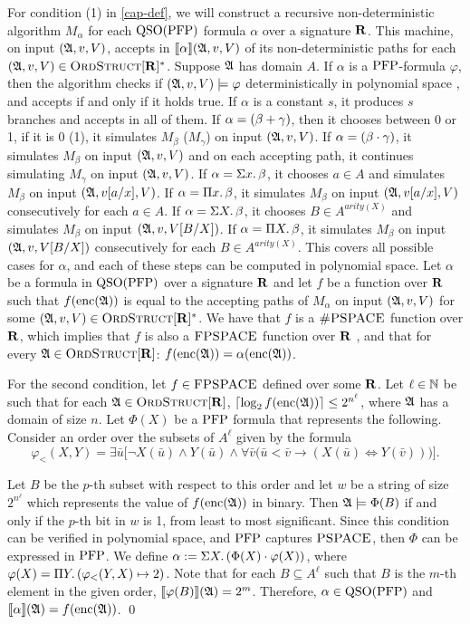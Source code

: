 For condition (1) in \ref{cap-def}, we will construct a recursive non-deterministic algorithm $M_{\alpha}$ for each ${\rm QSO}({\rm PFP})$ formula $\alpha$ over a signature $\mathbf{R}$. This machine, on input $(\mathfrak{A},v,V)$, accepts in ${\llbracket{}{\alpha}\rrbracket}(\mathfrak{A},v,V)$ of its non-deterministic paths for each $(\mathfrak{A},v,V) \in \text{\sc OrdStruct}[\mathbf{R}]^*$. Suppose $\mathfrak{A}$ has domain $A$. If $\alpha$ is a ${\rm PFP}$-formula $\varphi$, then the algorithm checks if $(\mathfrak{A},v,V)\models\varphi$ deterministically in polynomial space \cite{DBLP:conf/lics/AbiteboulV89}, and accepts if and only if it holds true. If $\alpha$ is a constant $s$, it produces $s$ branches and accepts in all of them. If $\alpha = (\beta + \gamma)$, then it chooses between 0 or 1, if it is 0 (1), it simulates $M_{\beta}$ ($M_{\gamma}$) on input $(\mathfrak{A},v,V)$. If $\alpha = (\beta \cdot \gamma)$, it simulates $M_{\beta}$ on input $(\mathfrak{A},v,V)$ and on each accepting path, it continues simulating $M_{\gamma}$ on input $(\mathfrak{A},v,V)$. If $\alpha = \Sigma{x}.\,\beta$, it chooses $a\in A$ and simulates $M_{\beta}$ on input $(\mathfrak{A},v[a/x],V)$. If $\alpha = \Pi{x}.\,\beta$, it simulates $M_{\beta}$ on input $(\mathfrak{A},v[a/x],V)$ consecutively for each $a\in A$. If $\alpha = \Sigma{X}.\,\beta$, it chooses $B\in A^{arity(X)}$ and simulates $M_{\beta}$ on input $(\mathfrak{A},v,V[B/X])$. If $\alpha = \Pi{X}.\,\beta$, it simulates $M_{\beta}$ on input $(\mathfrak{A},v,V[B/X])$ consecutively for each $B\in A^{arity(X)}$. This covers all possible cases for $\alpha$, and each of these steps can be computed in polynomial space. Let $\alpha$ be a formula in ${\rm QSO}({\rm PFP})$ over a signature $\mathbf{R}$ and let $f$ be a function over $\mathbf{R}$ such that $f({\rm enc}(\mathfrak{A}))$ is equal to the accepting paths of $M_{\alpha}$ on input $(\mathfrak{A},v,V)$ for some $(\mathfrak{A},v,V) \in \text{\sc OrdStruct}[\mathbf{R}]^*$. We have that $f$ is a $\text{\sc \#PSPACE}$ function over $\mathbf{R}$, which implies that $f$ is also a $\text{\sc FPSPACE}$ function over $\mathbf{R}$ \cite{DBLP:journals/siamcomp/Ladner89}, and that for every $\mathfrak{A}\in\text{\sc OrdStruct}[\mathbf{R}]$: $f({\rm enc}(\mathfrak{A})) = \alpha({\rm enc}(\mathfrak{A}))$. 

For the second condition, let $f\in \text{\sc FPSPACE}$ defined over some $\mathbf{R}$. Let $\ell\in\mathbb{N}$ be such that for each $\mathfrak{A}\in\text{\sc OrdStruct}[\mathbf{R}]$, $\lceil\log_2 f({\rm enc}(\mathfrak{A})) \rceil \leq 2^{n^\ell}$, where $\mathfrak{A}$ has a domain of size $n$. Let $\Phi(X)$ be a ${\rm PFP}$ formula that represents the following. Consider an order over the subsets of $A^{\ell}$ given by the formula $$\varphi_{<}(X,Y) = \exists\bar{u}\big[\neg X(\bar{u})\wedge Y(\bar{u})\wedge \forall\bar{v}\big(
\bar{u}<\bar{v}\to(X(\bar{u})\iff Y(\bar{v}))\big)\big].$$ 

Let $B$ be the $p$-th subset with respect to this order and let $w$ be a string of size $2^{n^{\ell}}$ which represents the value of $f({\rm enc}(\mathfrak{A}))$ in binary. Then $\mathfrak{A}\models\Phi(B)$ if and only if the $p$-th bit in $w$ is 1, from least to most significant. Since this condition can be verified in polynomial space, and ${\rm PFP}$ captures $\text{\sc PSPACE}$, then $\Phi$ can be expressed in ${\rm PFP}$. We define
$\alpha := \Sigma{X}.\,(\Phi(X)\cdot\varphi(X))$, where $\varphi(X) = \Pi{Y}.\,(\varphi_{<}(Y,X)\mapsto 2)$. Note that for each $B\subseteq A^{\ell}$ such that $B$ is the $m$-th element in the given order, ${\llbracket{}{\varphi(B)}\rrbracket}(\mathfrak{A}) = 2^m$. Therefore, $\alpha\in{\rm QSO}({\rm PFP})$ and ${\llbracket{}{\alpha}\rrbracket}(\mathfrak{A}) = f({\rm enc}(\mathfrak{A}))$. \qed

